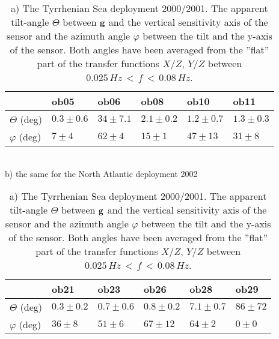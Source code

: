 \documentclass{article}
\begin{document}
{%
\begin{table}
\begin{center}
\caption{
a) The Tyrrhenian Sea deployment 2000/2001. 
The apparent tilt-angle $\Theta$ between ${\bf g}$ and the 
vertical sensitivity axis of the sensor 
and the azimuth angle $\varphi$ between the tilt and the y-axis of the 
sensor. 
Both angles have been averaged from the ''flat'' 
part of the transfer functions $X/Z$, $Y/Z$ between
$0.025 \, Hz \, < \, f \, < \, 0.08 \, Hz$.
}
\vskip0.5cm
\label{tilt_table}
\begin{tabular}{|l||l|l|l|l|l|}
\hline
& ob05 & ob06 & ob08 & ob10 & ob11 \\
\hline
$\Theta$ (deg) &  
 $0.3  \pm 0.6$ &
 $34  \pm 7.1  $ &
 $2.1  \pm 0.2 $ &
 $1.2  \pm 0.7 $ &
 $1.3  \pm 0.3 $ 
\\
\hline
$\varphi$ (deg) &  
 $7 \pm  4$ &
 $62 \pm  4 $ &
 $15  \pm  1 $ &
 $47 \pm 13 $ &
 $31 \pm  8 $ 
\\
\hline
\end{tabular}
\\
\vskip0.5cm
b) the same for the North Atlantic deployment 2002
\vskip0.5cm
\begin{tabular}{|l||l|l|l|l|l|}
\hline
& ob21 & ob23 & ob26 & ob28 & ob29 \\
\hline
$\Theta$ (deg) &  
 $0.3 \pm 0.2  $ &
 $0.7 \pm 0.6 $ &
 $0.8 \pm 0.2 $ &
 $7.1  \pm  0.7 $ &
 $86 \pm  72  $ 
\\
\hline
$\varphi$ (deg) &  
 $36 \pm  8 $ &
 $51 \pm  6 $ &
 $67\pm 12$ &
 $64 \pm  2 $ &
 $0 \pm 0 $ 
\\
\hline
\end{tabular}
\end{center}
\end{table}
}
\end{document}
